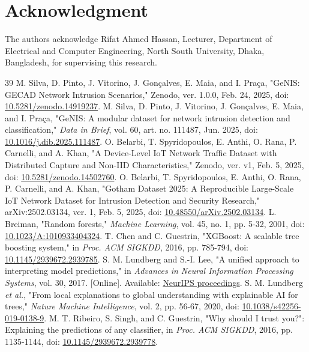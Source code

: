\documentclass[journal,letterpaper]{IEEEtran}
\begin{document}
\section*{Acknowledgment}
The authors acknowledge Rifat Ahmed Hassan, Lecturer, Department of Electrical and Computer Engineering, North South University, Dhaka, Bangladesh, for supervising this research.
\begin{thebibliography}{39}
 M. Silva, D. Pinto, J. Vitorino, J. Gonçalves, E. Maia, and I. Praça, "GeNIS: GECAD Network Intrusion Scenarios," Zenodo, ver. 1.0.0, Feb. 24, 2025, doi: \href{https://doi.org/10.5281/zenodo.14919237}{10.5281/zenodo.14919237}.
 M. Silva, D. Pinto, J. Vitorino, J. Gonçalves, E. Maia, and I. Praça, "GeNIS: A modular dataset for network intrusion detection and classification," \emph{Data in Brief}, vol. 60, art. no. 111487, Jun. 2025, doi: \href{https://doi.org/10.1016/j.dib.2025.111487}{10.1016/j.dib.2025.111487}.
 O. Belarbi, T. Spyridopoulos, E. Anthi, O. Rana, P. Carnelli, and A. Khan, "A Device-Level IoT Network Traffic Dataset with Distributed Capture and Non-IID Characteristics," Zenodo, ver. v1, Feb. 5, 2025, doi: \href{https://doi.org/10.5281/zenodo.14502760}{10.5281/zenodo.14502760}.
 O. Belarbi, T. Spyridopoulos, E. Anthi, O. Rana, P. Carnelli, and A. Khan, "Gotham Dataset 2025: A Reproducible Large-Scale IoT Network Dataset for Intrusion Detection and Security Research," arXiv:2502.03134, ver. 1, Feb. 5, 2025, doi: \href{https://doi.org/10.48550/arXiv.2502.03134}{10.48550/arXiv.2502.03134}.
 L. Breiman, "Random forests," \emph{Machine Learning}, vol. 45, no. 1, pp. 5-32, 2001, doi: \href{https://doi.org/10.1023/A:1010933404324}{10.1023/A:1010933404324}.
 T. Chen and C. Guestrin, "XGBoost: A scalable tree boosting system," in \emph{Proc. ACM SIGKDD}, 2016, pp. 785-794, doi: \href{https://doi.org/10.1145/2939672.2939785}{10.1145/2939672.2939785}.
 S. M. Lundberg and S.-I. Lee, "A unified approach to interpreting model predictions," in \emph{Advances in Neural Information Processing Systems}, vol. 30, 2017. [Online]. Available: \href{https://proceedings.neurips.cc/paper/2017/hash/8a20a8621978632d76c43dfd28b67767-Abstract.html}{NeurIPS proceedings}.
 S. M. Lundberg \emph{et al.}, "From local explanations to global understanding with explainable AI for trees," \emph{Nature Machine Intelligence}, vol. 2, pp. 56-67, 2020, doi: \href{https://doi.org/10.1038/s42256-019-0138-9}{10.1038/s42256-019-0138-9}.
 M. T. Ribeiro, S. Singh, and C. Guestrin, "Why should I trust you?": Explaining the predictions of any classifier, in \emph{Proc. ACM SIGKDD}, 2016, pp. 1135-1144, doi: \href{https://doi.org/10.1145/2939672.2939778}{10.1145/2939672.2939778}.

\end{thebibliography}
\end{document}
